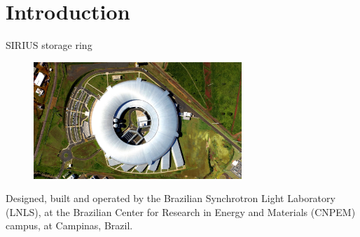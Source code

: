 \documentclass[aspectratio=169]{beamer}
\begin{document}
\section{Introduction}
\begin{frame}{SIRIUS storage ring}
    \begin{minipage}{0.35\textwidth}
        \begin{figure}
            \centering
            \includegraphics[angle=90, width=0.7\textwidth]{f1.png}
        \end{figure}
    \end{minipage}
    \hfill
    \begin{minipage}{0.62\textwidth}
        \scriptsize
        Designed, built and operated by the Brazilian Synchrotron Light Laboratory (LNLS), at the Brazilian Center for Research in Energy and Materials (CNPEM) campus, at Campinas, Brazil.\\


\end{minipage}
\end{frame}
\end{document}

